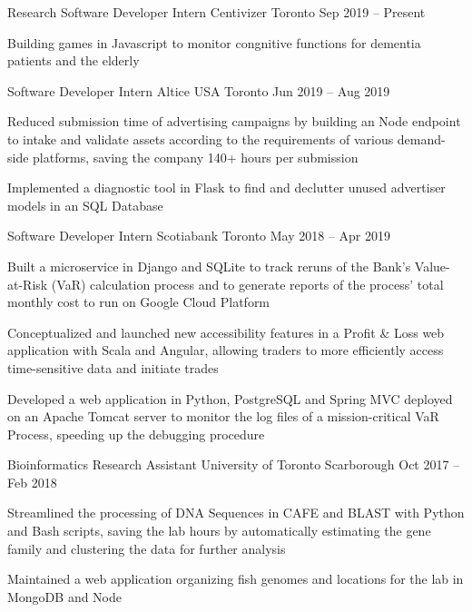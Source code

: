 \begin{cventries}
  \cventry
    {Research Software Developer Intern}
    {Centivizer}
    {Toronto}
    {Sep 2019 -- Present}
    {}
    {
      \begin{cvitems}
        \item {Building games in Javascript to monitor congnitive functions for dementia patients and the elderly}
      \end{cvitems}
    }
  \cventry
    {Software Developer Intern}
    {Altice USA}
    {Toronto}
    {Jun 2019 -- Aug 2019}
    {}
    {
    \begin{cvitems}
      \item {Reduced submission time of advertising campaigns by building an Node endpoint to intake and validate assets according to the requirements of various demand-side platforms, saving the company 140+ hours per submission}
      \item {Implemented a diagnostic tool in Flask to find and declutter unused advertiser models in an SQL Database}
    \end{cvitems}
    }
  \cventry
    {Software Developer Intern}
    {Scotiabank}
    {Toronto}
    {May 2018 -- Apr 2019}
    {}
    {
      \begin{cvitems}
        \item {Built a microservice in Django and SQLite to track reruns of the Bank's Value-at-Risk (VaR) calculation process and to generate reports of the process' total monthly cost to run on Google Cloud Platform}
        \item {Conceptualized and launched new accessibility features in a Profit \& Loss web application with Scala and Angular, allowing traders to more efficiently access time-sensitive data and initiate trades}
        \item {Developed a web application in Python, PostgreSQL and Spring MVC deployed on an Apache Tomcat server to monitor the log files of a mission-critical VaR Process, speeding up the debugging procedure}
      \end{cvitems}
    }

  \cventry
    {Bioinformatics Research Assistant}
    {University of Toronto}
    {Scarborough}
    {Oct 2017 -- Feb 2018}
    {}
    {
      \begin{cvitems}
        \item {Streamlined the processing of DNA Sequences in CAFE and BLAST with Python and Bash scripts, saving the lab hours by automatically estimating the gene family and clustering the data for further analysis}
        \item {Maintained a web application organizing fish genomes and locations for the lab in MongoDB and Node}
      \end{cvitems}
    }
\end{cventries}
